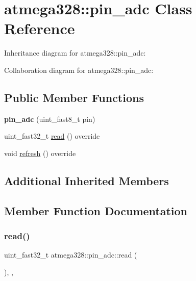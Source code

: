 \hypertarget{classatmega328_1_1pin__adc}{}\section{atmega328\+:\+:pin\+\_\+adc Class Reference}
\label{classatmega328_1_1pin__adc}


Inheritance diagram for atmega328\+:\+:pin\+\_\+adc\+:


Collaboration diagram for atmega328\+:\+:pin\+\_\+adc\+:
\subsection*{Public Member Functions}
\begin{DoxyCompactItemize}
\item 
\mbox{\label{classatmega328_1_1pin__adc_a9110ab125d258acd73583ad46a707278}} 
{\bfseries pin\+\_\+adc} (uint\+\_\+fast8\+\_\+t pin)
\item 
uint\+\_\+fast32\+\_\+t \hyperlink{classatmega328_1_1pin__adc_a4017fd7e32de94fc9e895cd9e9346430}{read} () override
\item 
void \hyperlink{classatmega328_1_1pin__adc_af71ffd74aacbf0aac5f6693a065896a2}{refresh} () override
\end{DoxyCompactItemize}
\subsection*{Additional Inherited Members}


\subsection{Member Function Documentation}
\mbox{\label{classatmega328_1_1pin__adc_a4017fd7e32de94fc9e895cd9e9346430}} 
\subsubsection{\texorpdfstring{read()}{read()}}
{\footnotesize\ttfamily uint\+\_\+fast32\+\_\+t atmega328\+::pin\+\_\+adc\+::read (\begin{DoxyParamCaption}{ }\end{DoxyParamCaption})\hspace{0.3cm}{\ttfamily [inline]}, {\ttfamily [override]}, {\ttfamily [virtual]}}

